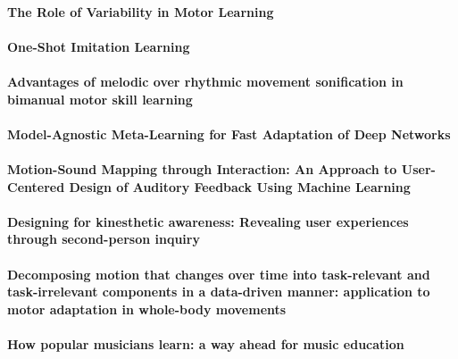 \documentclass[11pt]{article}
\begin{document}
\paragraph{The Role of Variability in Motor Learning} \citep{dhawale_role_2017}


\paragraph{One-Shot Imitation Learning} \citep{duan_one-shot_2017}


\paragraph{Advantages of melodic over rhythmic movement sonification in bimanual motor skill learning} \citep{dyer_advantages_2017}


\paragraph{Model-Agnostic Meta-Learning for Fast Adaptation of Deep Networks} \citep{finn_model-agnostic_2017}


\paragraph{Motion-Sound Mapping through Interaction: An Approach to User-Centered Design of Auditory Feedback Using Machine Learning} \citep{francoise_motion-sound_2018}


\paragraph{Designing for kinesthetic awareness: Revealing user experiences through second-person inquiry} \citep{francoise_designing_2017}


\paragraph{Decomposing motion that changes over time into task-relevant and task-irrelevant components in a data-driven manner: application to motor adaptation in whole-body movements} \citep{furuki_decomposing_2019}


\paragraph{How popular musicians learn: a way ahead for music education} \citep{green_how_2002}
\end{document}
